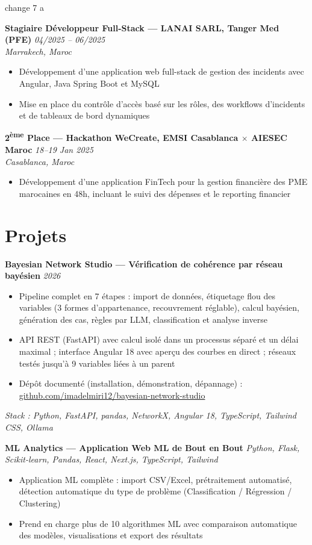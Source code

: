 change 7 a \documentclass[11pt,a4paper]{article}
\newcommand{\heading}[2]{\textbf{#1} \hfill \textit{#2}\\}
\newcommand{\stackline}[1]{\textit{\small Stack : #1}\par}
\begin{document}
\heading{Stagiaire D\'eveloppeur Full-Stack --- LANAI SARL, Tanger Med (PFE)}{04/2025 -- 06/2025}
\textit{Marrakech, Maroc}
\begin{itemize}
    \item D\'eveloppement d'une application web full-stack de gestion des incidents avec Angular, Java Spring Boot et MySQL
    \item Mise en place du contr\^ole d'acc\`es bas\'e sur les r\^oles, des workflows d'incidents et de tableaux de bord dynamiques
\end{itemize}

\heading{2\textsuperscript{\`eme} Place --- Hackathon WeCreate, EMSI Casablanca $\times$ AIESEC Maroc}{18--19 Jan 2025}
\textit{Casablanca, Maroc}
\begin{itemize}
    \item D\'eveloppement d'une application FinTech pour la gestion financi\`ere des PME marocaines en 48h, incluant le suivi des d\'epenses et le reporting financier
\end{itemize}

\section*{Projets}

\heading{Bayesian Network Studio --- V\'erification de coh\'erence par r\'eseau bay\'esien}{2026}
\begin{itemize}
    \item Pipeline complet en 7 \'etapes : import de donn\'ees, \'etiquetage flou des variables (3 formes d'appartenance, recouvrement r\'eglable), calcul bay\'esien, g\'en\'eration des cas, r\`egles par LLM, classification et analyse inverse
    \item API REST (FastAPI) avec calcul isol\'e dans un processus s\'epar\'e et un d\'elai maximal ; interface Angular 18 avec aper\c{c}u des courbes en direct ; r\'eseaux test\'es jusqu'\`a 9 variables li\'ees \`a un parent
    \item D\'ep\^ot document\'e (installation, d\'emonstration, d\'epannage) : \href{https://github.com/imadelmiri12/bayesian-network-studio}{github.com/imadelmiri12/bayesian-network-studio}
\end{itemize}
\stackline{Python, FastAPI, pandas, NetworkX, Angular 18, TypeScript, Tailwind CSS, Ollama}

\vspace{4pt}
\textbf{ML Analytics --- Application Web ML de Bout en Bout} \hfill \textit{Python, Flask, Scikit-learn, Pandas, React, Next.js, TypeScript, Tailwind}
\begin{itemize}
    \item Application ML compl\`ete : import CSV/Excel, pr\'etraitement automatis\'e, d\'etection automatique du type de probl\`eme (Classification / R\'egression / Clustering)
    \item Prend en charge plus de 10 algorithmes ML avec comparaison automatique des mod\`eles, visualisations et export des r\'esultats
\end{itemize}
\end{document}
